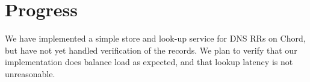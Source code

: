 \section{Progress}

We have implemented a simple store and look-up service
for DNS RRs on Chord,
but have not yet handled verification of the records.
We plan to verify that our implementation does balance load
as expected, and that lookup latency is not unreasonable.

